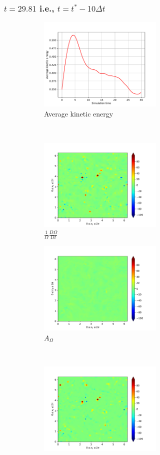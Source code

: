 \subsubsection{$t=29.81$ i.e., $t=t^{\ast} - 10\Delta t$} 
\begin{figure}[H]
    \begin{subfigure}[H]{0.45\textwidth}
        \includegraphics[height=1.75in]{media/run-cds-65/ke-average1310}
        \caption{Average kinetic energy}
    \end{subfigure}
    ~
    \begin{subfigure}[H]{0.45\textwidth}
        \includegraphics[height=1.75in]{media/run-cds-65/enst-1310}
        \caption{$\frac{1}{\Omega} \frac{D \Omega}{Dt}$}
    \end{subfigure}
    \newline
    \begin{subfigure}{0.45\textwidth}
        \includegraphics[height=1.75in]{media/run-cds-65/A-enst-1310}
        \caption{$A_{\Omega}$}
    \end{subfigure}
    ~
    \begin{subfigure}{0.45\textwidth}
        \includegraphics[height=1.75in]{media/run-cds-65/Pi-enst-1310}

\end{subfigure}
\end{figure}
